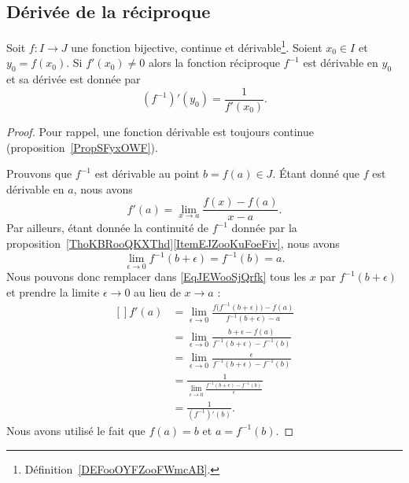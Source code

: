 \subsection{Dérivée de la réciproque}

\begin{proposition} \label{PropMRBooXnnDLq}
	Soit \( f\colon I\to J\) une fonction bijective, continue et dérivable\footnote{Définition~\ref{DEFooOYFZooFWmcAB}.}. Soient \( x_0\in I\) et \( y_0=f(x_0)\). Si \( f'(x_0)\neq 0\) alors la fonction réciproque \( f^{-1}\) est dérivable en \( y_0\) et sa dérivée est donnée par
	\begin{equation}
		(f^{-1})'(y_0)=\frac{1}{ f'(x_0) }.
	\end{equation}
\end{proposition}

\begin{proof}
	Pour rappel, une fonction dérivable est toujours continue (proposition~\ref{PropSFyxOWF}).

	Prouvons que \( f^{-1}\) est dérivable au point \( b=f(a)\in J\). Étant donné que \( f\) est dérivable en \( a\), nous avons
	\begin{equation}\label{EqJEWooSjQrfk}
		f'(a)=\lim_{x\to a} \frac{ f(x)-f(a) }{ x-a }.
	\end{equation}
	Par ailleurs, étant donnée la continuité de \( f^{-1}\) donnée par la proposition~\ref{ThoKBRooQKXThd}\ref{ItemEJZooKuFoeFiv}, nous avons
	\begin{equation}
		\lim_{\epsilon\to 0} f^{-1}(b+\epsilon)=f^{-1}(b)=a.
	\end{equation}
	Nous pouvons donc remplacer dans \eqref{EqJEWooSjQrfk} tous les \( x\) par \( f^{-1}(b+\epsilon)\) et prendre la limite \( \epsilon\to 0\) au lieu de \( x\to a\) :
	\begin{equation}
		\begin{aligned}[]
			f'(a) & =\lim_{\epsilon\to 0}\frac{ f\big( f^{-1}(b+\epsilon) \big)-f(a) }{ f^{-1}(b+\epsilon)-a } \\
			      & =\lim_{\epsilon\to 0}\frac{ b+\epsilon-f(a) }{ f^{-1}(b+\epsilon)-f^{-1}(b) }              \\
			      & =\lim_{\epsilon\to 0}\frac{ \epsilon }{ f^{-1}(b+\epsilon)-f^{-1}(b) }                     \\
			      & =\frac{1}{ \lim_{\epsilon\to 0}\frac{ f^{-1}(b+\epsilon)-f^{-1}(b) }{ \epsilon } }         \\
			      & =\frac{1}{ (f^{-1})'(b) }.
		\end{aligned}
	\end{equation}
	Nous avons utilisé le fait que \( f(a)=b\) et \( a=f^{-1}(b)\).
\end{proof}


